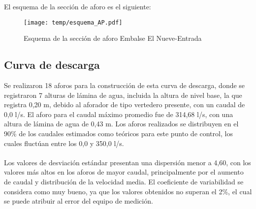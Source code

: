 \documentclass[]{article}
\begin{document}
El esquema de la sección de aforo es el siguiente:

\begin{figure}[H]
  \centering
  \texttt{[image: temp/esquema\_AP.pdf]}
\caption{Esquema de la sección de aforo Embalse El Nueve-Entrada}
\label{fig:Esquema_AP}
\end{figure}

\subsection{Curva de descarga}\label{curva-de-descarga-15}

Se realizaron 18 aforos para la construcción de esta curva de descarga, donde se registraron 7 alturas de lámina de agua, incluida la altura de nivel base, la que registra 0,20 m, debido al aforador de tipo vertedero presente, con un caudal de 0,0 l/s. El aforo para el caudal máximo promedio fue de 314,68 l/s, con una altura de lámina de agua de 0,43 m. Los aforos realizados se distribuyen en el 90\% de los caudales estimados como teóricos para este punto de control, los cuales fluctúan entre los 0,0 y 350,0 l/s.\\
\\
Los valores de desviación estándar presentan una dispersión menor a 4,60, con los valores más altos en los aforos de mayor caudal, principalmente por el aumento de caudal y distribución de la velocidad media. El coeficiente de variabilidad se considera como muy bueno, ya que los valores obtenidos no superan el 2\%, el cual se puede atribuir al error del equipo de medición.
\end{document}

